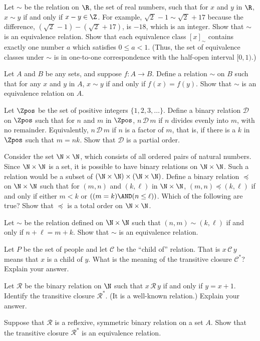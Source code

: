 \begin{exercises}
\problem Let $\sim$ be the relation on $\R$, the set of real numbers,
such that for $x$ and $y$ in $\R$, $x\sim y$ if and only if
$x-y\in\Z$.  For example, $\sqrt{2\,}-1\sim\sqrt{2\,}+17$
because the difference, $(\sqrt{2\,}-1)-(\sqrt{2\,}+17)$,
is $-${}$18$, which is an integer.  Show that $\sim$ is an equivalence
relation.  Show that each equivalence class $[x]_{\sim}$ contains
exactly one number $a$ which satisfies $0\le a<1$.  (Thus,
the set of equivalence classes under $\sim$ is in one-to-one
correspondence with the half-open interval $[0,1)$.)

\problem Let $A$ and $B$ be any sets, and suppose $f\colon A\to B$.
Define a relation $\sim$ on $B$ such that for any $x$ and $y$ in $A$,
$x\sim y$ if and only if $f(x)=f(y)$.  Show that $\sim$ is an
equivalence relation on $A$.

\problem Let $\Zpos$ be the set of positive integers $\{1,2,3,\dots\}$.
Define a binary relation $\mathscr D$ on $\Zpos$ such
that for $n$ and $m$ in $\Zpos$, $n\,{\mathscr D}\,m$ if
$n$ divides evenly into $m$, with no remainder.  Equivalently,
$n\,{\mathscr D}\,m$ if $n$ is a factor of $m$, that is, if
there is a $k$ in $\Zpos$ such that $m=nk$.  Show that $\mathscr D$
is a partial order.

\problem Consider the set $\N\times\N$, which consists of all
ordered pairs of natural numbers.  Since $\N\times\N$ is
a set, it is possible to have binary relations on $\N\times\N$.
Such a relation would be a subset of $(\N\times\N)\times(\N\times\N)$.
Define a binary relation $\preceq$ on $\N\times\N$ such that
for $(m,n)$ and $(k,\ell)$ in $\N\times\N$, $(m,n)\preceq(k,\ell)$
if and only if either $m<k$ or $((m=k)\AND (n\le\ell))$.  Which of the following
are true?
Show that $\preceq$ is a total order on $\N\times\N$.

\problem Let $\sim$ be the relation defined on $\N\times\N$
such that $(n,m)\sim(k,\ell)$ if and only if $n+\ell=m+k$.
Show that $\sim$ is an equivalence relation.

\problem Let $P$ be the set of people and let $\mathscr C$ be the
``child of'' relation.  That is $x\,{\mathscr C}\,y$ means that
$x$ is a child of $y$.  What is the meaning of the transitive
closure ${\mathscr C}^*$?  Explain your answer.

\problem Let $\mathscr R$ be the binary relation on $\N$ such that
$x\,{\mathscr R}\,y$ if and only if $y=x+1$.  Identify the
transitive closure ${\mathscr R}^*$.  (It is a well-known relation.)
Explain your answer.

\problem Suppose that $\mathscr R$ is a reflexive, symmetric
binary relation on a set $A$.  Show that the transitive closure
${\mathscr R}^*$ is an equivalence relation.

\end{exercises}



